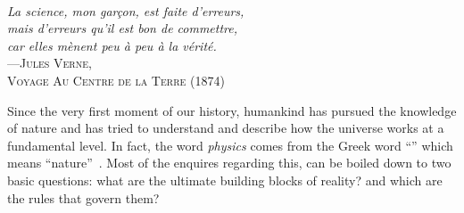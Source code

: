 \vspace*{0.1 cm} 
\hspace*{200pt} \\
\hspace*{120pt} \textit{La science, mon garçon, est faite d’erreurs,} \\
\hspace*{120pt} \textit{mais d’erreurs qu’il est bon de commettre,} \\
\hspace*{120pt} \textit{car elles mènent peu à peu à la vérité.} \\
\hspace*{150pt} ---\textsc{Jules Verne,} \\%
\hspace*{160 pt}     \textsc{Voyage Au Centre de la Terre (1874)} \\%
\vspace*{2cm} 


Since the very first moment of our history, humankind has pursued the knowledge of nature
and has tried to understand and describe how the universe works at a fundamental level. 
In fact, the word \textit{physics} comes from the Greek word ``\greekphys'' which means 
``nature''~\cite{etymology_web, Greek_web}.
Most of the enquires regarding this, can be boiled down to two basic questions:
what are the ultimate building blocks of reality? and which are the rules that govern them?

